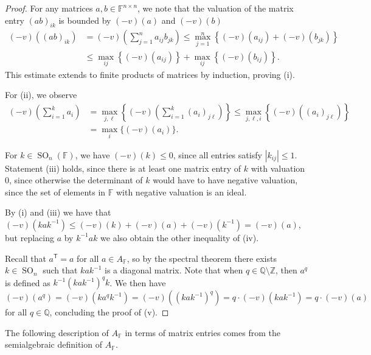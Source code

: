 \documentclass[12pt]{amsart}
\newcommand{\F}{\mathbb{F} }
\newcommand{\Q}{\mathbb{Q} }
\newcommand{\Z}{\mathbb{Z} }
\newcommand{\tran}{{^{\mathsf{T}}\!}}
\numberwithin{equation}{section}
\theoremstyle{remark} %
\begin{document}
\begin{proof}
	For any matrices $a,b \in \F^{n\times n}$, we note that the valuation of the matrix entry $(ab)_{ik}$ is bounded by $(-v)(a)$ and $(-v)(b)$
	\begin{align*}
		(-v)((ab)_{ik}) &= (-v)\left(\sum_{j=1}^n a_{ij}b_{jk} \right)
		\leq \max_{j=1}^n \left\{ (-v)(a_{ij}) + (-v)(b_{jk}) \right\}
		\\ &\leq \max_{ij} \left\{ (-v)(a_{ij}) \right\} + \max_{ij}\left\{ (-v)(b_{ij})\right\}.
	\end{align*}
	This estimate extends to finite products of matrices by induction, proving (i).
	
	For (ii), we observe
	\begin{align*}
		(-v)\left(\sum_{i=1}^k a_i\right) &= \max_{j,\ell}\left\{  (-v)\left(\sum_{i=1}^k (a_i)_{j\ell} \right) \right\} 
		\leq \max_{j,\ell, i} \left\{ (-v)\left((a_i)_{j\ell}\right)  \right\} \\
		&= \max_i \{ (-v)(a_i) \}.
	\end{align*}
	
	For $k\in \operatorname{SO}_n(\F)$, we have $(-v)(k) \leq 0$, since all entries satisfy $|k_{ij}|\leq 1$. Statement (iii) holds, since there is at least one matrix entry of $k$ with valuation $0$, since otherwise the determinant of $k$ would have to have negative valuation, since the set of elements in $\F$ with negative valuation is an ideal.
	
	By (i) and (iii) we have that $(-v)(kak^{-1}) \leq  (-v)(k) + (-v)(a) + (-v)(k^{-1}) = (-v)(a)$, but replacing $a$ by $k^{-1}ak$ we also obtain the other inequality of (iv).
	
	
	Recall that $a\tran = a$ for all $a\in A_\F$, so by the spectral theorem there exists $k\in \operatorname{SO}_n$ such that $kak^{-1}$ is a diagonal matrix. Note that when $q \in \Q \setminus \Z$, then $a^q$ is defined as $k^{-1}(kak^{-1})^q k$. We then have 
	$$
	(-v)(a^q) = (-v)\left(ka^qk^{-1}\right) 
	= (-v)\left(\left(kak^{-1}\right)^q\right)
	= q \cdot (-v)\left( kak^{-1} \right)
	= q \cdot (-v)(a)
	$$
	for all $q\in \Q$, concluding the proof of (v).  
\end{proof}



The following description of $A_\F$ in terms of matrix entries comes from the semialgebraic definition of $A_\F$.
\end{document}
